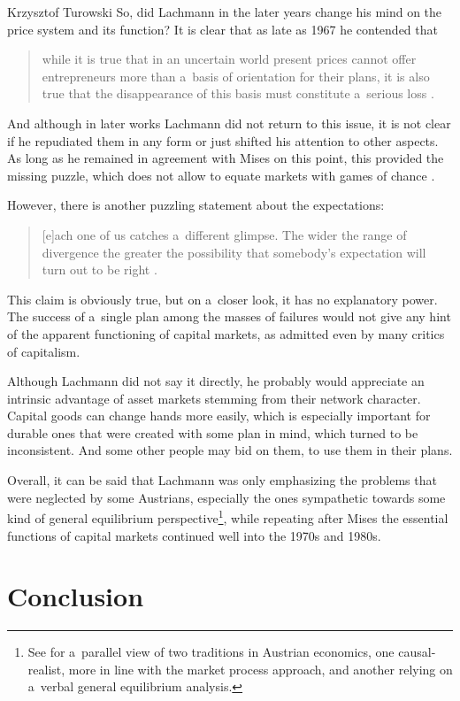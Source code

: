 \begin{artengenv}{Krzysztof Turowski}
So, did Lachmann in the later years change his mind on the price system and its function?
It is clear that as late as 1967 he contended that
\begin{quote}
while it is true that in an uncertain world present prices cannot offer entrepreneurs more than a~basis of orientation for their plans, it is also true that the disappearance of this basis must constitute a~serious loss \parencite[300]{lachmann-causes}.
\end{quote}
And although in later works Lachmann did not return to this issue, it is not clear if he repudiated them in any form or just shifted his attention to other aspects.
As long as he remained in agreement with Mises on this point, this provided the missing puzzle, which does not allow to equate markets with games of chance \parencite[221]{manish}.

However, there is another puzzling statement about the expectations:
\begin{quote}
[e]ach one of us catches a~different glimpse. The wider the range of divergence the greater the possibility that somebody's expectation will turn out to be right \parencite[59]{lachmann-kaleidic}.
\end{quote}
This claim is obviously true, but on a~closer look, it has no explanatory power. The success of a~single plan among the masses of failures would not give any hint of the apparent functioning of capital markets, as admitted even by many critics of capitalism.

Although Lachmann did not say it directly, he probably would appreciate an intrinsic advantage of asset markets stemming from their network character. Capital goods can change hands more easily, which is especially important for durable ones that were created with some plan in mind, which turned to be inconsistent. And some other people may bid on them, to use them in their plans.

Overall, it can be said that Lachmann was only emphasizing the problems that were neglected by some Austrians, especially the ones sympathetic towards some kind of general equilibrium perspective\footnote{See \textcite{salerno-place,salerno-wieser} for a~parallel view of two traditions in Austrian economics, one causal-realist, more in line with the market process approach, and another relying on a~verbal general equilibrium analysis.}, while repeating after Mises the essential functions of capital markets continued well into the 1970s and 1980s.

\section{Conclusion}


\end{artengenv}
